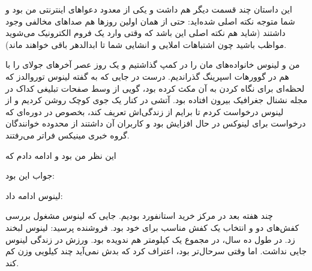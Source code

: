 این داستان چند قسمت دیگر هم داشت و یکی از معدود دعواهای اینترنتی من
بود و شما متوجه نکته اصلی شده‌اید: حتی از همان اولین روزها هم صداهای
مخالفی وجود داشتند (شاید هم نکته اصلی این باشد که وقتی وارد یک فروم
الکترونیک می‌شوید مواظب باشید چون اشتباهات املایی و انشایی شما تا
ابدالدهر باقی خواهند ماند).

\begin{journal}
من و لینوس خانواده‌های مان را در کمپ گذاشتیم و یک روز عصر آخرهای جولای
را با هم در گوورهات‌ اسپرینگ
گذراندیم. درست در جایی که به گفته لینوس توروالدز که لحظه‌ای برای نگاه
کردن به آن مکث کرده بود، گویی از وسط صفحات تبلیغی کداک در مجله نشنال
جغرافیک بیرون افتاده بود. آتشی در کنار یک جوی کوچک روشن کردیم و از
لینوس درخواست کردم تا برایم از زندگی‌اش تعریف کند، بخصوص در دوره‌ای که
درخواست برای لینوکس در حال افزایش بود و کاربران آن داشتند از محدوده
خوانندگان گروه خبری مینیکس فراتر می‌رفتند.

 این نظر من بود و ادامه دادم که

جواب این بود: 

لینوس ادامه داد: 

چند هفته بعد در مرکز خرید استانفورد بودیم. جایی که لینوس مشغول بررسی
کفش‌های دو و انتخاب یک کفش مناسب برای خود بود. فروشنده پرسید:
 لینوس لبخند زد. در طول ده
سال، در مجموع یک کیلومتر هم ندویده بود. ورزش در زندگی لینوس جایی
نداشت. اما وقتی سرحال‌تر بود، اعتراف کرد که بدش نمی‌آید چند کیلویی وزن
کم کند.


\end{journal}
